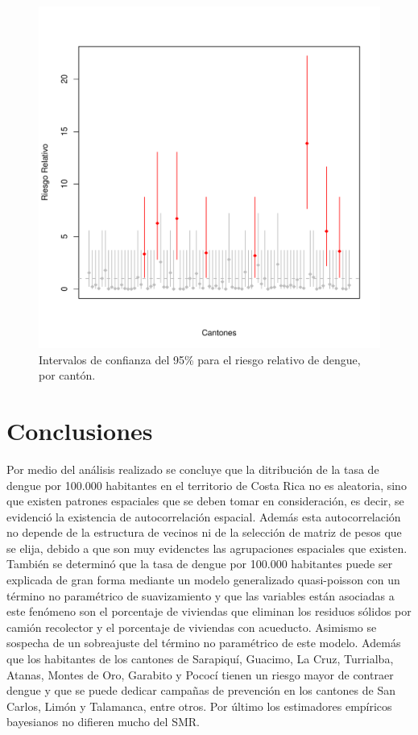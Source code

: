 \documentclass[12pt,a4paper]{article}
\begin{document}
\begin{figure}[h]
\centering
\includegraphics[scale=0.75]{F6.pdf}
\caption{Intervalos de confianza del 95\% para el riesgo relativo de dengue, por cantón.}
\end{figure}

\section{Conclusiones}

Por medio del análisis realizado se concluye que la ditribución de la tasa de dengue por 100.000 habitantes en el territorio de Costa Rica no es aleatoria, sino que existen patrones espaciales que se deben tomar en consideración, es decir, se evidenció la existencia de autocorrelación espacial. Además esta autocorrelación no depende de la estructura de vecinos ni de la selección de matriz de pesos que se elija, debido a que son muy evidenctes las agrupaciones espaciales que existen. También se determinó que la tasa de dengue por 100.000 habitantes puede ser explicada de gran forma mediante un modelo generalizado quasi-poisson con un término no paramétrico de suavizamiento y que las variables están asociadas a este fenómeno son el porcentaje de viviendas que eliminan los residuos sólidos por camión recolector y el porcentaje de viviendas con acueducto. Asimismo se sospecha de un sobreajuste del término no paramétrico de este modelo. Además que los habitantes de los cantones de Sarapiquí, Guacimo, La Cruz, Turrialba, Atanas, Montes de Oro, Garabito y Pococí tienen un riesgo mayor de contraer dengue y que se puede dedicar campañas de prevención en los cantones de San Carlos, Limón y Talamanca, entre otros. Por último los estimadores empíricos bayesianos no difieren mucho del SMR.
\newpage
\end{document}
